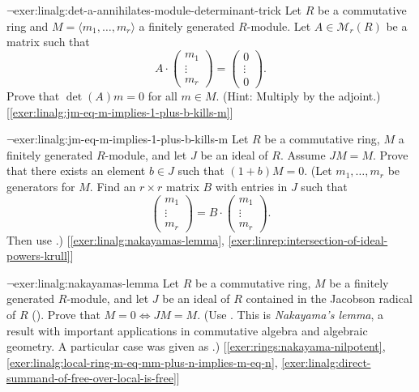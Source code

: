 \begin{exer}{$\lnot$}{exer:linalg:det-a-annihilates-module-determinant-trick}
  Let $R$ be a commutative ring and
  $M = \langle m_1, \dots, m_r \rangle$ a finitely generated
  $R$-module. Let $A \in \mathcal{M}_r(R)$ be a matrix such that
  \[
    A \cdot \begin{pmatrix} m_1 \\ \vdots \\ m_r \end{pmatrix} =
    \begin{pmatrix} 0 \\ \vdots \\ 0 \end{pmatrix}.
  \]
  Prove that $\det(A) m = 0$ for all $m \in M$. (Hint: Multiply by the
  adjoint.) [\ref{exer:linalg:jm-eq-m-implies-1-plus-b-kills-m}]
\end{exer}
\begin{exer}{$\lnot$}{exer:linalg:jm-eq-m-implies-1-plus-b-kills-m}
  Let $R$ be a commutative ring, $M$ a finitely generated $R$-module,
  and let $J$ be an ideal of $R$. Assume $JM = M$. Prove that there
  exists an element $b \in J$ such that $(1+b)M = 0$. (Let
  $m_1, \dots, m_r$ be generators for $M$. Find an $r \times r$ matrix
  $B$ with entries in $J$ such that
  \[
    \begin{pmatrix} m_1 \\ \vdots \\ m_r \end{pmatrix} = B \cdot
    \begin{pmatrix} m_1 \\ \vdots \\ m_r \end{pmatrix}.
  \]
  Then use
  .)
  [\ref{exer:linalg:nakayamas-lemma},
  \ref{exer:linrep:intersection-of-ideal-powers-krull}]
\end{exer}
\begin{exer}{$\lnot$}{exer:linalg:nakayamas-lemma}
  Let $R$ be a commutative ring, $M$ be a finitely generated
  $R$-module, and let $J$ be an ideal of $R$ contained in the Jacobson
  radical of $R$
  (). Prove that
  $M = 0 \iff JM = M$. (Use
  .  This is
  \emph{Nakayama's lemma}, a result with important applications in
  commutative algebra and algebraic geometry. A particular case was
  given as .)
  [\ref{exer:rings:nakayama-nilpotent},
  \ref{exer:linalg:local-ring-m-eq-mm-plus-n-implies-m-eq-n},
  \ref{exer:linalg:direct-summand-of-free-over-local-is-free}]
\end{exer}
